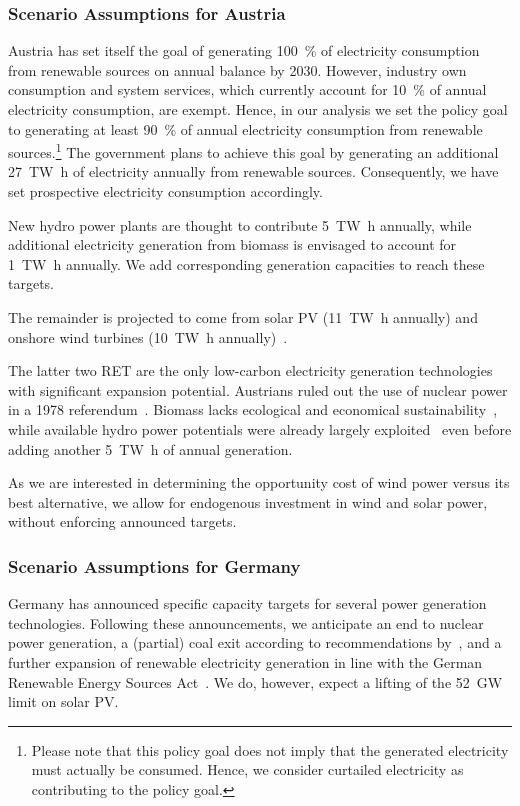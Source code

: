 \documentclass[final, 3p, times]{elsarticle} %
\begin{document}
    \subsubsection{Scenario Assumptions for Austria}\label{subsubsec:assumptions-austria}
    Austria has set itself the goal of generating \SI{100}{\percent} of electricity consumption from renewable sources
    on annual balance by 2030.
    However, industry own consumption and system services, which currently account for \SI{10}{\percent} of annual
    electricity consumption, are exempt.
    Hence, in our analysis we set the policy goal to generating at least \SI{90}{\percent} of annual electricity
    consumption from renewable sources.\footnote{Please note that this policy goal does not imply that the generated
    electricity must actually be consumed.
    Hence, we consider curtailed electricity as contributing to the policy goal.}
    The government plans to achieve this goal by generating an additional \SI{27}{\tera\watt\hour} of electricity
    annually from renewable sources.
    Consequently, we have set prospective electricity consumption accordingly.

    New hydro power plants are thought to contribute \SI{5}{\tera\watt\hour} annually, while additional electricity
    generation from biomass is envisaged to account for \SI{1}{\tera\watt\hour} annually.
    We add corresponding generation capacities to reach these targets.

    The remainder is projected to come from solar PV (\SI{11}{\tera\watt\hour} annually) and onshore wind turbines
    (\SI{10}{\tera\watt\hour} annually)~\cite{Regierungsprogramm2020}.

    The latter two RET are the only low-carbon electricity generation technologies with significant expansion potential.
    Austrians ruled out the use of nuclear power in a 1978 referendum~\citep{Pelinka1983}.
    Biomass lacks ecological and economical sustainability~\citep{Erb2018}, while available hydro power potentials were
    already largely exploited~\citep{Walder2014} even before adding another \SI{5}{\tera\watt\hour} of annual generation.

    As we are interested in determining the opportunity cost of wind power versus its best alternative, we allow for
    endogenous investment in wind and solar power, without enforcing announced targets.

    \subsubsection{Scenario Assumptions for Germany}\label{subsubsec:assumptions-germany}
    Germany has announced specific capacity targets for several power generation technologies.
    Following these announcements, we anticipate an end to nuclear power generation, a (partial) coal exit according to
    recommendations by~\cite{WSB2019}, and a further expansion of renewable electricity generation in line
    with the German Renewable Energy Sources Act~\cite{noauthor_renewable_2017}.
    We do, however, expect a lifting of the \SI{52}{\giga\watt} limit on solar PV\@.
\end{document}
